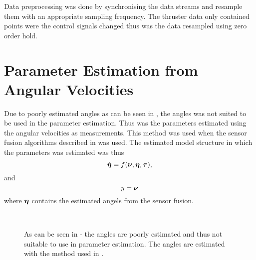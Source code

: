 Data preprocessing was done by synchronising the data streams and resample them with an appropriate sampling frequency. The thruster data only contained points were the control signals changed thus was the data resampled using zero order hold.  

\section{Parameter Estimation from Angular Velocities} \label{sec:estimation_angular}
Due to poorly estimated angles as can be seen in , the angles was not suited to be used in the parameter estimation. Thus was the parameters estimated using the angular velocities as measurements. This method was used when the sensor fusion algorithms described in  was used. The estimated model structure in which the parameters was estimated was thus 
\begin{equation}
\dot{\boldsymbol{\eta}} = f(\boldsymbol{\nu}, \boldsymbol{\eta}, \boldsymbol{\tau}),
\end{equation}
and
\begin{equation}
y = \boldsymbol{\nu}
\end{equation}
where $\boldsymbol{\eta}$ contains the estimated angels from the sensor fusion.

\begin{figure}[tbp]
  \centering
  \qquad
  \\
  \caption{\label{fig:integratedAngleVelocities}%
    As can be seen in \protect{}-\protect{} the angles are poorly estimated and thus not suitable to use in parameter estimation. The angles are estimated with the method used in .}
\end{figure}


